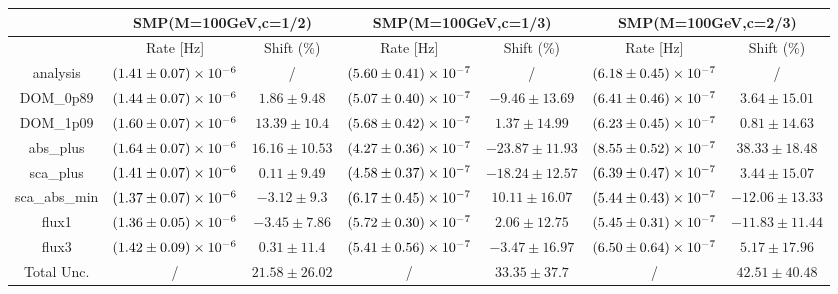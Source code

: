 \documentclass{article}%
\begin{document}
%
\scriptsize%
\noindent%
\begin{tabular}{|c||c|c|c|c|c|c|}%
\hline%
&\multicolumn{2}{|c|}{SMP(M=100GeV,c=1/2)}&\multicolumn{2}{|c|}{SMP(M=100GeV,c=1/3)}&\multicolumn{2}{|c|}{SMP(M=100GeV,c=2/3)}\\%
\hline%
&Rate {[}Hz{]}&Shift (\%)&Rate {[}Hz{]}&Shift (\%)&Rate {[}Hz{]}&Shift (\%)\\%
\hline%
\hline%
analysis&$\num{1.41 \pm 0.07e-06}$&/&$\num{5.6 \pm 0.41e-07}$&/&$\num{6.18 \pm 0.45e-07}$&/\\%
\hline%
DOM\_0p89&$\num{1.44 \pm 0.07e-06}$&$1.86 \pm 9.48$&$\num{5.07 \pm 0.4e-07}$&$-9.46 \pm 13.69$&$\num{6.41 \pm 0.46e-07}$&$3.64 \pm 15.01$\\%
\hline%
DOM\_1p09&$\num{1.6 \pm 0.07e-06}$&$13.39 \pm 10.4$&$\num{5.68 \pm 0.42e-07}$&$1.37 \pm 14.99$&$\num{6.23 \pm 0.45e-07}$&$0.81 \pm 14.63$\\%
\hline%
abs\_plus&$\num{1.64 \pm 0.07e-06}$&$16.16 \pm 10.53$&$\num{4.27 \pm 0.36e-07}$&$-23.87 \pm 11.93$&$\num{8.55 \pm 0.52e-07}$&$38.33 \pm 18.48$\\%
\hline%
sca\_plus&$\num{1.41 \pm 0.07e-06}$&$0.11 \pm 9.49$&$\num{4.58 \pm 0.37e-07}$&$-18.24 \pm 12.57$&$\num{6.39 \pm 0.47e-07}$&$3.44 \pm 15.07$\\%
\hline%
sca\_abs\_min&$\num{1.37 \pm 0.07e-06}$&$-3.12 \pm 9.3$&$\num{6.17 \pm 0.45e-07}$&$10.11 \pm 16.07$&$\num{5.44 \pm 0.43e-07}$&$-12.06 \pm 13.33$\\%
\hline%
flux1&$\num{1.36 \pm 0.05e-06}$&$-3.45 \pm 7.86$&$\num{5.72 \pm 0.3e-07}$&$2.06 \pm 12.75$&$\num{5.45 \pm 0.31e-07}$&$-11.83 \pm 11.44$\\%
\hline%
flux3&$\num{1.42 \pm 0.09e-06}$&$0.31 \pm 11.4$&$\num{5.41 \pm 0.56e-07}$&$-3.47 \pm 16.97$&$\num{6.5 \pm 0.64e-07}$&$5.17 \pm 17.96$\\%
\hline%
\hline%
Total Unc.&/&$21.58 \pm 26.02$&/&$33.35 \pm 37.7$&/&$42.51 \pm 40.48$\\%
\hline%
\end{tabular}%
\newline%
\end{document}
